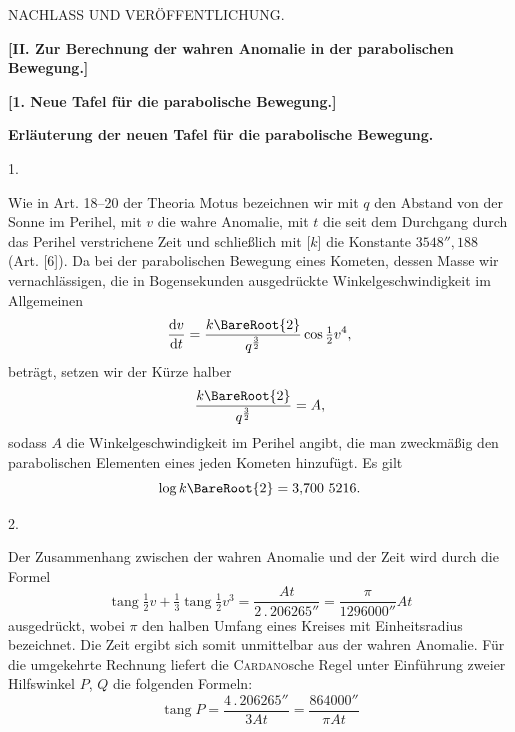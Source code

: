 \clearpage
{}
\begin{center}
{\large NACHLASS UND VERÖFFENTLICHUNG.\par}
\bigskip
{}
\textbf{[II. Zur Berechnung der wahren Anomalie in der parabolischen Bewegung.]}\par
\bigskip
{}
\textbf{[1. Neue Tafel für die parabolische Bewegung.]}\par
\medskip
\textbf{Erläuterung der neuen Tafel für die parabolische Bewegung.}
\end{center}
\medskip
{}
\begin{center}1.\end{center}
\noindent\hspace*{\parindent}Wie in Art. 18–20 der Theoria Motus bezeichnen wir mit \(q\) den Abstand von der Sonne im Perihel, mit \(v\) die wahre Anomalie, mit \(t\) die seit dem Durchgang durch das Perihel verstrichene Zeit und schließlich mit [\(k\)] die Konstante \(3548''{,}188\) (Art. [6]). Da bei der parabolischen Bewegung eines Kometen, dessen Masse wir vernachlässigen, die in Bogensekunden ausgedrückte Winkelgeschwindigkeit im Allgemeinen
\[
\frac{\mathrm{d}v}{\mathrm{d}t}=\frac{k\BareRoot{2}}{q^{\frac32}}\cos\tfrac12v^4,
\]
beträgt, setzen wir der Kürze halber
\[
\frac{k\BareRoot{2}}{q^{\frac32}}=A,
\]
sodass \(A\) die Winkelgeschwindigkeit im Perihel angibt, die man zweckmäßig den parabolischen Elementen eines jeden Kometen hinzufügt. Es gilt
\[
\log k\BareRoot{2}=3{,}700\ 5216.
\]
\par\medskip
{}
\begin{center}2.\end{center}
\noindent\hspace*{\parindent}Der Zusammenhang zwischen der wahren Anomalie und der Zeit wird durch die Formel
\[
\operatorname{tang}\tfrac12v+\tfrac13\operatorname{tang}\tfrac12v^3
=\frac{At}{2\mathpunct{.}206265''}=\frac{\pi}{1296000''}At
\]
ausgedrückt, wobei \(\pi\) den halben Umfang eines Kreises mit Einheitsradius bezeichnet. Die Zeit ergibt sich somit unmittelbar aus der wahren Anomalie. Für die umgekehrte Rechnung liefert die \textsc{Cardano}sche Regel unter Einführung zweier Hilfswinkel \(P\), \(Q\) die folgenden Formeln:
\[
\operatorname{tang}P=\frac{4\mathpunct{.}206265''}{3At}=\frac{864000''}{\pi At}
\]
